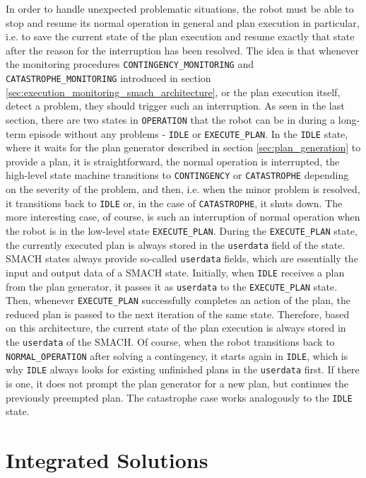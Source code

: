 \documentclass[english, master, utf8]{base/thesis_KBS}
\newcommand{\code}[1]{\colorbox{light-gray}{\texttt{#1}}}
\begin{document}
In order to handle unexpected problematic situations, the robot must be able to stop and resume its normal operation in general
and plan execution in particular, i.e. to save the current state of the plan execution and resume exactly that state after the reason
for the interruption has been resolved. The idea is that whenever the monitoring procedures \code{CONTINGENCY\_MONITORING} and \code{CATASTROPHE\_MONITORING} 
introduced in section \ref{sec:execution_monitoring_smach_architecture}, or the plan execution itself, detect a problem, they should trigger such an interruption.
As seen in the last section, there are two states in \code{OPERATION} that the robot can be in during a long-term episode without any problems
- \code{IDLE} or \code{EXECUTE\_PLAN}. In the \code{IDLE} state, where it waits for the plan generator described in section \ref{sec:plan_generation} to provide a plan,
it is straightforward, the normal operation is interrupted, the high-level state machine transitions to \code{CONTINGENCY} or \code{CATASTROPHE} depending
on the severity of the problem, and then, i.e. when the minor problem is resolved, it transitions back to \code{IDLE} or, in the case of \code{CATASTROPHE},
it shuts down. The more interesting case, of course, is such an interruption of normal operation when the robot is in the low-level state \code{EXECUTE\_PLAN}.
During the \code{EXECUTE\_PLAN} state, the currently executed plan is always stored in the \code{userdata} field of the state.
SMACH states always provide so-called \code{userdata} fields, which are essentially the input and output data of a SMACH state.
Initially, when \code{IDLE} receives a plan from the plan generator, it passes it as \code{userdata} to the \code{EXECUTE\_PLAN} state.
Then, whenever \code{EXECUTE\_PLAN} successfully completes an action of the plan, the reduced plan is passed to the next iteration of the same state.
Therefore, based on this architecture, the current state of the plan execution is always stored in the \code{userdata} of the SMACH.
Of course, when the robot transitions back to \code{NORMAL\_OPERATION} after solving a contingency, it starts again in \code{IDLE}, which is why \code{IDLE} 
always looks for existing unfinished plans in the \code{userdata} first. If there is one, it does not prompt the plan generator for a new plan, but continues the previously 
preempted plan. The catastrophe case works analogously to the \code{IDLE} state.

\chapter{Integrated Solutions}
\end{document}
